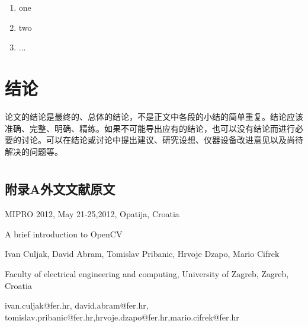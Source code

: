 \documentclass{bjtu-bachelor-thesis}
\begin{document}
\begin{enumerate}
    \item one
    \item two
    \item ...
\end{enumerate}

\chapter{结论}
论文的结论是最终的、总体的结论，不是正文中各段的小结的简单重复。结论应该准确、完整、明确、精练。如果不可能导出应有的结论，也可以没有结论而进行必要的讨论。可以在结论或讨论中提出建议、研究设想、仪器设备改进意见以及尚待解决的问题等。
\newpage
\pagestyle{myfancy}


\printbibliography[heading=myheading]
\cleardoublepage
\thankspage
{}
\appendix

\chapter*{}

\section*{附录A\hspace{1em}外文文献原文}
\noindent MIPRO 2012, May 21-25,2012, Opatija, Croatia \par

\begin{center}
    A brief introduction to OpenCV\par
    Ivan Culjak, David Abram, Tomislav Pribanic, Hrvoje Dzapo, Mario Cifrek\par
    Faculty of electrical engineering and computing, University of Zagreb, Zagreb, Croatia\par
    ivan.culjak@fer.hr, david.abram@fer.hr, tomislav.pribanic@fer.hr,hrvoje.dzapo@fer.hr,mario.cifrek@fer.hr
\end{center}
\end{document}
